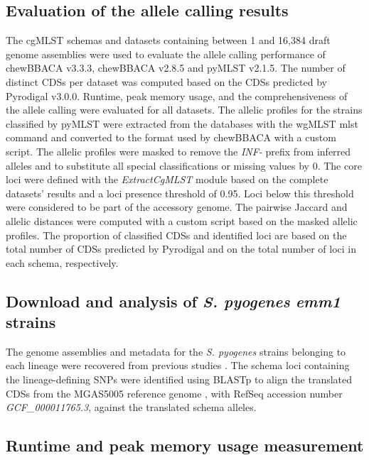 \subsection{Evaluation of the allele calling results} \label{ssec:methods_ssec5}

The cgMLST schemas and datasets containing between 1 and 16,384 draft genome assemblies were used to evaluate the allele calling performance of chewBBACA v3.3.3, chewBBACA v2.8.5 and pyMLST v2.1.5. The number of distinct CDSs per dataset was computed based on the CDSs predicted by Pyrodigal v3.0.0. Runtime, peak memory usage, and the comprehensiveness of the allele calling were evaluated for all datasets. The allelic profiles for the strains classified by pyMLST were extracted from the databases with the wgMLST mlst command and converted to the format used by chewBBACA with a custom script. The allelic profiles were masked to remove the \textit{INF-} prefix from inferred alleles and to substitute all special classifications or missing values by 0. The core loci were defined with the \textit{ExtractCgMLST} module based on the complete datasets' results and a loci presence threshold of 0.95. Loci below this threshold were considered to be part of the accessory genome. The pairwise Jaccard and allelic distances were computed with a custom script based on the masked allelic profiles. The proportion of classified CDSs and identified loci are based on the total number of CDSs predicted by Pyrodigal and on the total number of loci in each schema, respectively.

\subsection{Download and analysis of \textit{S. pyogenes} \textit{emm1} strains} \label{ssec:methods_ssec6}

The genome assemblies and metadata for the \textit{S. pyogenes} strains belonging to each lineage were recovered from previous studies \citep{lynskey_emergence_2019, johannesen_increase_2023, friaes_annotated_2022}. The schema loci containing the lineage-defining SNPs were identified using BLASTp to align the translated CDSs from the MGAS5005 reference genome \citep{sumby_evolutionary_2005}, with RefSeq accession number \textit{GCF\_000011765.3}, against the translated schema alleles.

\subsection{Runtime and peak memory usage measurement} \label{ssec:methods_ssec7}

